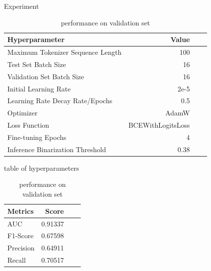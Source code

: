 \documentclass[final]{beamer}
\newlength{\colwidth}
\begin{document}
\begin{frame}[t]
\begin{columns}[t]
\begin{column}{\colwidth}
\begin{block}{Experiment}
    \begin{table}
    \begin{minipage}{0.48\linewidth}
      \centering
      \begin{tabular}{l r r c}
        \toprule
        \textbf{Hyperparameter} & \textbf{Value} \\
    \midrule
    Maximum Tokenizer Sequence Length & 100 \\
    Test Set Batch Size & 16 \\
    Validation Set Batch Size & 16 \\
    Initial Learning Rate & 2e-5 \\
    Learning Rate Decay Rate/Epochs & 0.5 \\
    Optimizer & AdamW \\
    Loss Function & BCEWithLogitsLoss \\
    Fine-tuning Epochs & 4 \\
    Inference Binarization Threshold & 0.38 \\
        \bottomrule
      \end{tabular}
      \caption{table of hyperparameters}
      \end{minipage}
      \begin{minipage}{0.48\linewidth}
      \centering
      \begin{tabular}{l r r c}
        \toprule
        \textbf{Metrics} & \textbf{Score} \\
        \midrule
         AUC & 0.91337 \\
    F1-Score & 0.67598 \\
    Precision & 0.64911 \\
    Recall & 0.70517 \\
        \bottomrule
      \end{tabular}
      \caption{performance on validation set}
      \end{minipage}
    \end{table}





\end{block}
\end{column}
\end{columns}
\end{frame}
\end{document}
